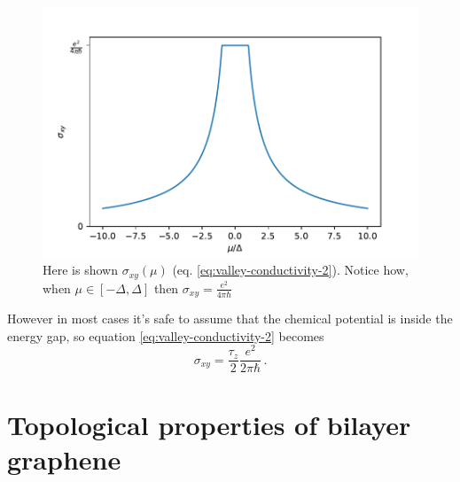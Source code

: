 \begin{figure}[h]
    \centering
    \includegraphics[width=\linewidth]{Immagini/ValleyHall/sigmaxy.pdf}
    \caption{Here is shown $\sigma_{xy}(\mu)$ (eq. \ref{eq:valley-conductivity-2}). Notice how, when $\mu \in [-\Delta,\Delta]$ then $\sigma_{xy}=\frac {e^2}{4\pi \hbar}$}
    \label{fig:sigma_xy}
\end{figure}


However in most cases it's safe to assume that the chemical potential is inside the energy gap, so equation \ref{eq:valley-conductivity-2} becomes
\begin{equation}
    \sigma_{xy}=\frac{\tau_z}2\frac {e^2}{2\pi \hbar}\,.
\end{equation}


\section{Topological properties of bilayer graphene}

